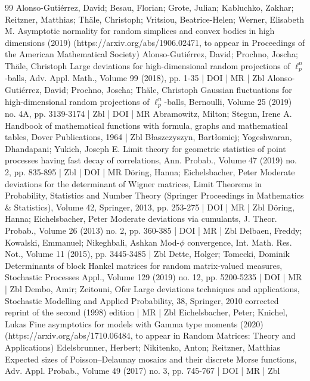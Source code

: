 \documentclass[10pt]{amsart}
\theoremstyle{definition}\newtheorem{defi}[theo]{Definition}\newtheorem{rema}[theo]{Remark}\newtheorem{exam}[theo]{Example}\newtheorem{exem}[theo]{Example}\newtheorem{nota}[theo]{Notation}
\begin{document}
\begin{thebibliography}{99}
Alonso-Gutiérrez, David; Besau, Florian; Grote, Julian; Kabluchko, Zakhar; Reitzner, Matthias; Thäle, Christoph; Vritsiou, Beatrice-Helen; Werner, Elisabeth M. Asymptotic normality for random simplices and convex bodies in high dimensions (2019) (https://arxiv.org/abs/1906.02471, to appear in Proceedings of the American Mathematical Society)
Alonso-Gutiérrez, David; Prochno, Joscha; Thäle, Christoph Large deviations for high-dimensional random projections of $\ell _p^n$-balls, Adv. Appl. Math., Volume 99 (2018), pp. 1-35 | DOI | MR | Zbl
Alonso-Gutiérrez, David; Prochno, Joscha; Thäle, Christoph Gaussian fluctuations for high-dimensional random projections of $\ell _p^n$-balls, Bernoulli, Volume 25 (2019) no. 4A, pp. 3139-3174 | Zbl | DOI | MR
Abramowitz, Milton; Stegun, Irene A. Handbook of mathematical functions with formula, graphs and mathematical tables, Dover Publications, 1964 | Zbl
Błaszczyszyn, Bartłomiej; Yogeshwaran, Dhandapani; Yukich, Joseph E. Limit theory for geometric statistics of point processes having fast decay of correlations, Ann. Probab., Volume 47 (2019) no. 2, pp. 835-895 | Zbl | DOI | MR
Döring, Hanna; Eichelsbacher, Peter Moderate deviations for the determinant of Wigner matrices, Limit Theorems in Probability, Statistics and Number Theory (Springer Proceedings in Mathematics \& Statistics), Volume 42, Springer, 2013, pp. 253-275 | DOI | MR | Zbl
Döring, Hanna; Eichelsbacher, Peter Moderate deviations via cumulants, J. Theor. Probab., Volume 26 (2013) no. 2, pp. 360-385 | DOI | MR | Zbl
Delbaen, Freddy; Kowalski, Emmanuel; Nikeghbali, Ashkan Mod-$\phi $ convergence, Int. Math. Res. Not., Volume 11 (2015), pp. 3445-3485 | Zbl
Dette, Holger; Tomecki, Dominik Determinants of block Hankel matrices for random matrix-valued measures, Stochastic Processes Appl., Volume 129 (2019) no. 12, pp. 5200-5235 | DOI | MR | Zbl
Dembo, Amir; Zeitouni, Ofer Large deviations techniques and applications, Stochastic Modelling and Applied Probability, 38, Springer, 2010 corrected reprint of the second (1998) edition | MR | Zbl
Eichelsbacher, Peter; Knichel, Lukas Fine asymptotics for models with Gamma type moments (2020) (https://arxiv.org/abs/1710.06484, to appear in Random Matrices: Theory and Applications)
Edelsbrunner, Herbert; Nikitenko, Anton; Reitzner, Matthias Expected sizes of Poisson–Delaunay mosaics and their discrete Morse functions, Adv. Appl. Probab., Volume 49 (2017) no. 3, pp. 745-767 | DOI | MR | Zbl

\end{thebibliography}
\end{document}
